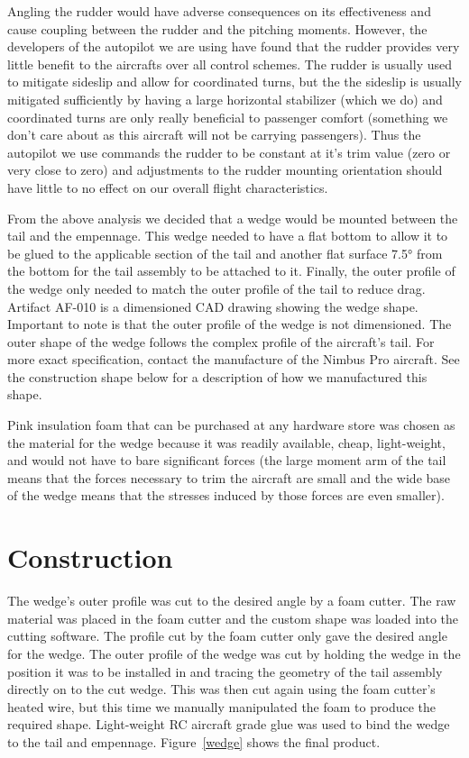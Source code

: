 \documentclass[]{auvsi_doc}
\begin{document}
Angling the rudder would have adverse consequences on its effectiveness and cause coupling between the rudder and the pitching moments. However, the developers of the autopilot we are using have found that the rudder provides very little benefit to the aircrafts over all control schemes. The rudder is usually used to mitigate sideslip and allow for coordinated turns, but the the sideslip is usually mitigated sufficiently by having a large horizontal stabilizer (which we do) and coordinated turns are only really beneficial to passenger comfort (something we don't care about as this aircraft will not be carrying passengers). Thus the autopilot we use commands the rudder to be constant at it's trim value (zero or very close to zero) and adjustments to the rudder mounting orientation should have little to no effect on our overall flight characteristics.
 
From the above analysis we decided that a wedge would be mounted between the tail and the empennage. This wedge needed to have a flat bottom to allow it to be glued to the applicable section of the tail and another flat surface 7.5° from the bottom for the tail assembly to be attached to it. Finally, the outer profile of the wedge only needed to match the outer profile of the tail to reduce drag. Artifact AF-010 is a dimensioned CAD drawing showing the wedge shape. Important to note is that the outer profile of the wedge is not dimensioned. The outer shape of the wedge follows the complex profile of the aircraft's tail. For more exact specification, contact the manufacture of the Nimbus Pro aircraft. See the construction shape below for a description of how we manufactured this shape. 
 
Pink insulation foam that can be purchased at any hardware store was chosen as the material for the wedge because it was readily available, cheap, light-weight, and would not have to bare significant forces (the large moment arm of the tail means that the forces necessary to trim the aircraft are small and the wide base of the wedge means that the stresses induced by those forces are even smaller). 

\section{Construction}

The wedge's outer profile was cut to the desired angle by a foam cutter. The raw material was placed in the foam cutter and the custom shape was loaded into the cutting software. The profile cut by the foam cutter only gave the desired angle for the wedge. The outer profile of the wedge was cut by holding the wedge in the position it was to be installed in and tracing the geometry of the tail assembly directly on to the cut wedge. This was then cut again using the foam cutter's heated wire, but this time we manually manipulated the foam to produce the required shape. Light-weight RC aircraft grade glue was used to bind the wedge to the tail and empennage. Figure~\ref{wedge} shows the final product.
\end{document}
